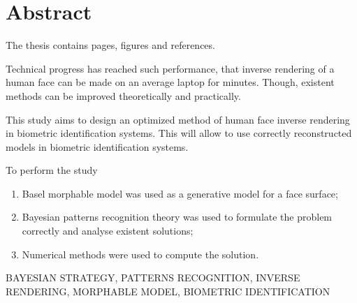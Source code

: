 \chapter*{Abstract}

The thesis contains \pageref{LastPage} pages,
 figures
and  references.

Technical progress has reached such performance,
that inverse rendering of a human face can be made on an average laptop
for minutes.
Though,
existent methods can be improved theoretically and practically.

This study aims to design an optimized method
of human face inverse rendering in biometric identification systems.
This will allow to use correctly reconstructed models
in biometric identification systems.

To perform the study
\begin{enumerate}
  \item
    Basel morphable model was used as a generative model for a face surface;
  \item
    Bayesian patterns recognition theory was used
    to formulate the problem correctly and analyse existent solutions;
  \item
    Numerical methods were used to compute the solution.
\end{enumerate}

\MakeUppercase{bayesian strategy, patterns recognition,
 inverse rendering, morphable model,
biometric identification}
